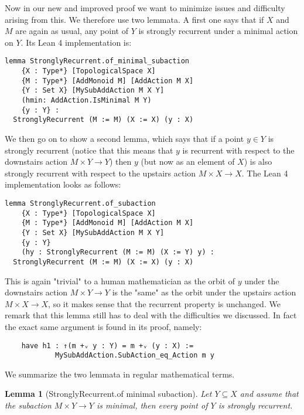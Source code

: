 \documentclass[11pt]{article}
\newtheorem{lemma}{Lemma}[section]
\theoremstyle{definition}              %
\theoremstyle{definition}              %
\theoremstyle{definition}              %
\begin{document}
Now in our new and improved proof we want to minimize issues and difficulty arising from this. We therefore use two lemmata. A first one says that if $X$ and $M$ are again as usual, any point of $Y$ is strongly recurrent under a minimal action on $Y$. Its Lean 4 implementation is:

\begin{lstlisting}
lemma StronglyRecurrent.of_minimal_subaction
    {X : Type*} [TopologicalSpace X]
    {M : Type*} [AddMonoid M] [AddAction M X]
    {Y : Set X} [MySubAddAction M X Y]
    (hmin: AddAction.IsMinimal M Y)
    {y : Y} :
  StronglyRecurrent (M := M) (X := X) (y : X)
\end{lstlisting}

We then go on to show a second lemma, which says that if a point $y \in Y$ is strongly recurrent (notice that this means that $y$ is recurrent with respect to the downstairs action $M \times Y \to Y$) then $y$ (but now as an element of $X$) is also strongly recurrent with respect to the upstairs action $M \times X \to X$. The Lean 4 implementation looks as follows:

\pagebreak

\begin{lstlisting}
lemma StronglyRecurrent.of_subaction
    {X : Type*} [TopologicalSpace X]
    {M : Type*} [AddMonoid M] [AddAction M X]
    {Y : Set X} [MySubAddAction M X Y]
    {y : Y}
    (hy : StronglyRecurrent (M := M) (X := Y) y) :
  StronglyRecurrent (M := M) (X := X) (y : X)
\end{lstlisting}

This is again "trivial" to a human mathematician as the orbit of $y$ under the downstairs action $M \times Y \to Y$ is the "same" as the orbit under the upstairs action $M \times X \to X$, so it makes sense that the recurrent property is unchanged. We remark that this lemma still has to deal with the difficulties we discussed. In fact the exact same argument is found in its proof, namely:

\begin{lstlisting}
    have h1 : ↑(m +ᵥ y : Y) = m +ᵥ (y : X) :=
            MySubAddAction.SubAction_eq_Action m y
\end{lstlisting}

We summarize the two lemmata in regular mathematical terms.

\begin{lemma}[StronglyRecurrent.of minimal subaction]\label{lem2}
    Let $Y \subseteq X$ and assume that the subaction $M \times Y \to Y$ is minimal, then every point of $Y$ is strongly recurrent.
\end{lemma}
\end{document}
